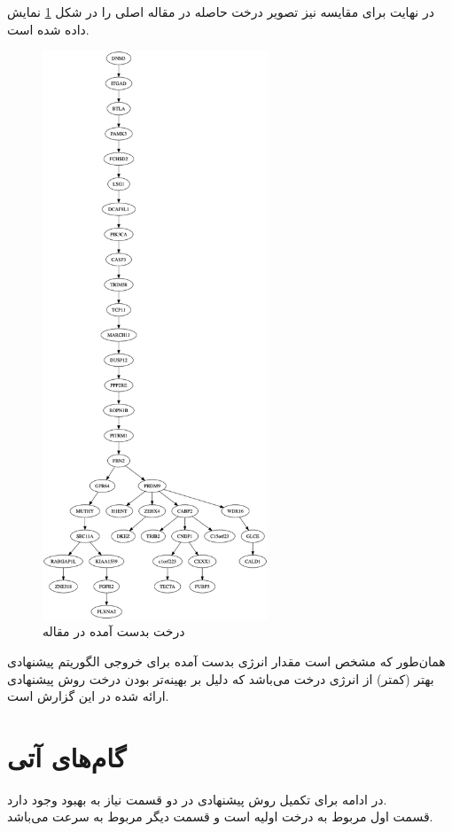 در نهایت برای مقایسه نیز تصویر درخت حاصله در مقاله اصلی  را در شکل \ref{fig:Gene_ٍSCITE} نمایش داده شده است.
\begin{figure}[!ht]
	\centering
	\includegraphics[width=0.6\textwidth]{img/res/SCITE}
	\caption{درخت بدست آمده در مقاله }
	\label{fig:Gene_ٍSCITE}
\end{figure}
همان‌طور که مشخص است مقدار انرژی بدست آمده برای خروجی الگوریتم پیشنهادی بهتر (کمتر) از انرژی درخت  می‌باشد که دلیل بر بهینه‌تر بودن درخت روش پیشنهادی ارائه شده در این گزارش است.

\newpage
\section{گام‌های آتی}
در ادامه برای تکمیل روش پیشنهادی در دو قسمت نیاز به بهبود وجود دارد.\\
قسمت اول مربوط به درخت اولیه است و قسمت دیگر مربوط به سرعت  می‌باشد.
